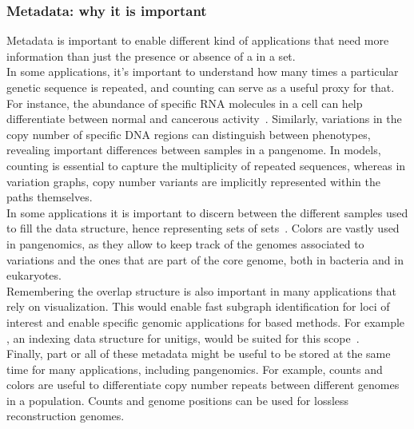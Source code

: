 \subsubsection{Metadata: why it is important}
Metadata is important to enable different kind of applications that need more information than just the presence or absence of a \kmer in a set. \\
In some applications, it's important to understand how many times a particular genetic sequence is repeated, and \kmer counting can serve as a useful proxy for that. For instance, the abundance of specific RNA molecules in a cell can help differentiate between normal and cancerous activity~\cite{kamrat,transipedia}. Similarly, variations in the copy number of specific \gls{DNA} regions can distinguish between phenotypes, revealing important differences between samples in a pangenome. In \dbg models, counting \kmers is essential to capture the multiplicity of repeated sequences, whereas in variation graphs, copy number variants are implicitly represented within the paths themselves.\\
In some applications it is important to discern between the different samples used to fill the data structure, hence representing sets of \kmer sets~\cite{metadbg}. Colors are vastly used in pangenomics, as they allow to keep track of the genomes associated to variations and the ones that are part of the core genome, both in bacteria and in eukaryotes.\\
Remembering the \dbg overlap structure is also important in many applications that rely on visualization. This would enable fast subgraph identification for loci of interest and enable specific genomic applications for \dbg based methods. For example \ssh, an indexing data structure for unitigs, would be suited for this scope~\cite{sshash}.\\
Finally, part or all of these metadata might be useful to be stored at the same time for many applications, including pangenomics. For example, \kmer counts and colors are useful to differentiate copy number repeats between different genomes in a population. Counts and genome positions can be used  for lossless reconstruction genomes.

